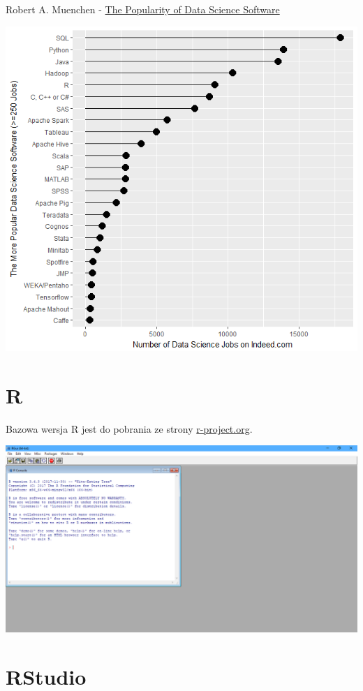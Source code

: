 \documentclass[
  letterpaper,
  DIV=11,
  numbers=noendperiod]{scrreprt}
\begin{document}
Robert A. Muenchen - \href{http://r4stats.com/articles/popularity/}{The
Popularity of Data Science Software}

\includegraphics{./img/pop_r1.png}

\hypertarget{r}{%
\section{R}\label{r}}

Bazowa wersja R jest do pobrania ze strony
\href{https://cloud.r-project.org/}{r-project.org}.

\includegraphics{./img/r.png}

\hypertarget{rstudio}{%
\section{RStudio}\label{rstudio}}
\end{document}
